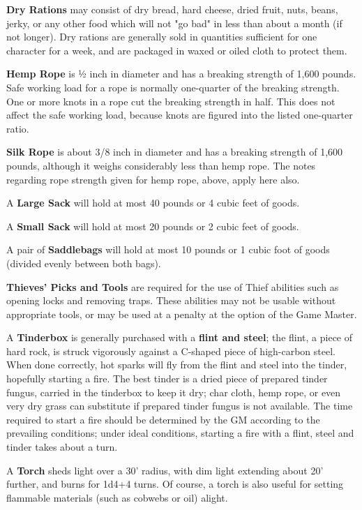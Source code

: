 \documentclass[a4paper,twoside,openany,10pt]{book}
\begin{document}
\begin{multicols}{2}
\textbf{Dry Rations} may consist of dry bread, hard cheese, dried fruit, nuts, beans, jerky, or any other food which will not "go bad" in less than about a month (if not longer). Dry rations are generally sold in quantities sufficient for one character for a week, and are packaged in waxed or oiled cloth to protect them.\smallskip

\textbf{Hemp Rope} is ½ inch in diameter and has a breaking strength of 1,600 pounds. Safe working load for a rope is normally one-quarter of the breaking strength. One or more knots in a rope cut the breaking strength in half. This does not affect the safe working load, because knots are figured into the listed one-quarter ratio.\smallskip

\textbf{Silk Rope} is about 3/8 inch in diameter and has a breaking strength of 1,600 pounds, although it weighs considerably less than hemp rope. The notes regarding rope strength given for hemp rope, above, apply here also.\smallskip

A \textbf{Large Sack} will hold at most 40 pounds or 4 cubic feet of goods.\smallskip

A \textbf{Small Sack} will hold at most 20 pounds or 2 cubic feet of goods.\smallskip

A pair of \textbf{Saddlebags} will hold at most 10 pounds or 1 cubic foot of goods (divided evenly between both bags).\smallskip

\textbf{Thieves' Picks and Tools} are required for the use of Thief abilities such as opening locks and removing traps. These abilities may not be usable without appropriate tools, or may be used at a penalty at the option of the Game Master.\smallskip

A \textbf{Tinderbox }is generally purchased with a \textbf{flint and steel}; the flint, a piece of hard rock, is struck vigorously against a C-shaped piece of high-carbon steel. When done correctly, hot sparks will fly from the flint and steel into the tinder, hopefully starting a fire. The best tinder is a dried piece of prepared tinder fungus, carried in the tinderbox to keep it dry; char cloth, hemp rope, or even very dry grass can substitute if prepared tinder fungus is not available. The time required to start a fire should be determined by the GM according to the prevailing conditions; under ideal conditions, starting a fire with a flint, steel and tinder takes about a turn.\smallskip

A \textbf{Torch} sheds light over a 30'{} radius, with dim light extending about 20'{} further, and burns for 1d4+4 turns. Of course, a torch is also useful for setting flammable materials (such as cobwebs or oil) alight.\smallskip


\end{multicols}
\end{document}
